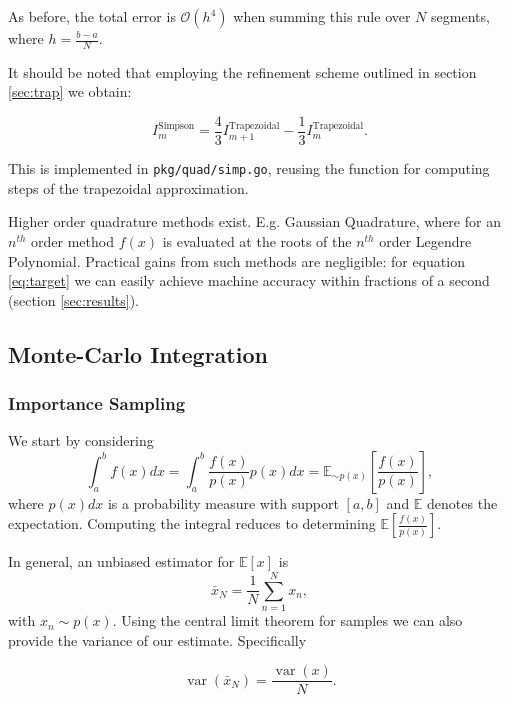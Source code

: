 \documentclass[10pt, a4paper]{article}
\begin{document}
  As before, the total error is $\mathcal{O}(h^4)$ when summing this rule over $N$ segments, where
  $h = \frac{b-a}{N}$.

  It should be noted that employing the refinement scheme outlined in section \ref{sec:trap} we
  obtain\cite{nr}:

  \begin{equation}
  I_m^{\text{Simpson}} = \frac{4}{3} I_{m+1}^{\text{Trapezoidal}} - \frac{1}{3} I_m^{\text{Trapezoidal}}.
  \end{equation}

  This is implemented in \texttt{pkg/quad/simp.go}, reusing the function for computing steps of the
  trapezoidal approximation.

  Higher order quadrature methods exist. E.g. Gaussian Quadrature, where for an $n^{th}$
  order method $f(x)$ is evaluated at the roots of the $n^{th}$ order Legendre Polynomial\cite{gauss}.
  Practical gains from such methods are negligible: for equation \ref{eq:target} we can easily achieve
  machine accuracy within fractions of a second (section \ref{sec:results}).

\subsection{Monte-Carlo Integration}
  \subsubsection{Importance Sampling}
  \label{sec:mon-is}

  We start by considering
  \begin{equation}
  \int_a^b f(x) dx = \int_{a}^{b} \frac{f(x)}{p(x)} p(x) dx = \mathbb{E}_{\sim p(x)}\left[ \frac{f(x)}{p(x)} \right],
  \end{equation}
  where $p(x)dx$ is a probability measure with support $[a, b]$ and $\mathbb{E}$ denotes the expectation.
  Computing the integral reduces to determining $\mathbb{E}\left[ \frac{f(x)}{p(x)} \right]$.

  In general, an unbiased estimator for $\mathbb{E}\left[ x \right]$ is
  \begin{equation}
  \bar{x}_N = \frac{1}{N} \sum_{n=1}^N x_n,
  \end{equation}
  with $x_n \sim p(x)$. Using the central limit theorem for \iid{} samples we can also provide the
  variance of our estimate. Specifically

  \begin{equation}
  \label{eq:var}
  \operatorname{var}(\bar{x}_N) = \frac{\operatorname{var}(x)}{N}.
  \end{equation}
\end{document}
